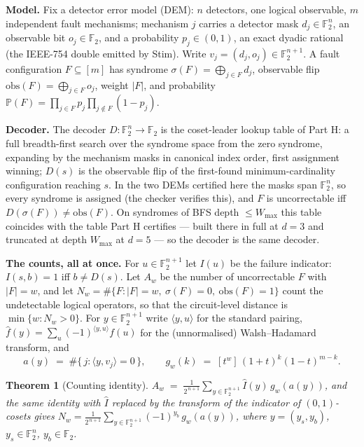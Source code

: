 \documentclass[11pt]{amsart}
\newcommand{\sig}{\sigma}
\newcommand{\obs}{\mathrm{obs}}
\newcommand{\Prb}{\mathbb{P}}
\newcommand{\Zt}{\mathbb{F}_2}
\theoremstyle{plain}
\newtheorem{theorem}{Theorem}[section]
\theoremstyle{definition}
\theoremstyle{remark}
\begin{document}
\textbf{Model.} Fix a detector error model (DEM): $n$ detectors, one logical
observable, $m$ independent fault mechanisms; mechanism $j$ carries a
detector mask $d_j \in \Zt^n$, an observable bit $o_j \in \Zt$, and a
probability $p_j \in (0,1)$, an exact dyadic rational (the IEEE-754 double
emitted by Stim). Write $v_j = (d_j, o_j) \in \Zt^{n+1}$. A fault
configuration $F \subseteq [m]$ has syndrome $\sig(F) = \bigoplus_{j \in F}
d_j$, observable flip $\obs(F) = \bigoplus_{j \in F} o_j$, weight $|F|$, and
probability $\Prb(F) = \prod_{j \in F} p_j \prod_{j \notin F} (1 - p_j)$.

\textbf{Decoder.} The decoder $D : \Zt^n \to \Zt$ is the coset-leader lookup
table of Part H: a full breadth-first search over the syndrome space from the
zero syndrome, expanding by the mechanism masks in canonical index order,
first assignment winning; $D(s)$ is the observable flip of the first-found
minimum-cardinality configuration reaching $s$. In the two DEMs certified
here the masks span $\Zt^n$, so every syndrome is assigned (the checker
verifies this), and $F$ is uncorrectable iff $D(\sig(F)) \ne \obs(F)$. On
syndromes of BFS depth $\le W_{\max}$ this table coincides with the table
Part H certifies --- built there in full at $d=3$ and truncated at depth
$W_{\max}$ at $d=5$ --- so the decoder is the same decoder.

\textbf{The counts, all at once.} For $u \in \Zt^{n+1}$ let $I(u)$ be the
failure indicator: $I(s, b) = 1$ iff $b \ne D(s)$. Let $A_w$ be the number of
uncorrectable $F$ with $|F| = w$, and let
$N_w = \#\{F : |F| = w,\ \sig(F) = 0,\ \obs(F) = 1\}$ count the undetectable
logical operators, so that the circuit-level distance is $\min\{w : N_w >
0\}$. For $y \in \Zt^{n+1}$ write $\langle y, u\rangle$ for the standard
pairing, $\widehat{f}(y) = \sum_u (-1)^{\langle y,u \rangle} f(u)$ for the
(unnormalised) Walsh--Hadamard transform, and
\[
a(y) \;=\; \#\{\, j : \langle y, v_j\rangle = 0 \,\}, \qquad
g_w(k) \;=\; [t^w]\,(1+t)^k (1-t)^{m-k} .
\]

\begin{theorem}[Counting identity]\label{thm:star}
$\displaystyle A_w \;=\; \frac{1}{2^{\,n+1}} \sum_{y \in \Zt^{n+1}}
\widehat{I}(y)\, g_w(a(y))$, and the same identity with $\widehat{I}$
replaced by the transform of the indicator of $(0,1)$-cosets gives
$\displaystyle N_w = \frac{1}{2^{\,n+1}} \sum_{y \in \Zt^{n+1}} (-1)^{y_b}\,
g_w(a(y))$, where $y = (y_s, y_b)$, $y_s \in \Zt^n$, $y_b \in \Zt$.
\end{theorem}
\end{document}
